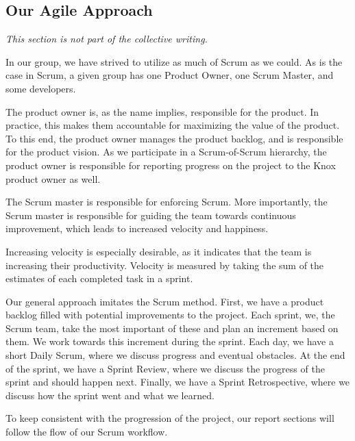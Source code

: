 \subsection{Our Agile Approach}\label{our_agile_approach}
\textit{This section is not part of the collective writing.}

In our group, we have strived to utilize as much of Scrum as we could.
As is the case in Scrum, a given group has one Product Owner, one Scrum Master, and some developers.

The product owner is, as the name implies, responsible for the product. In practice, this makes them accountable for maximizing the value of the product. To this end, the product owner manages the product backlog, and is responsible for the product vision. As we participate in a Scrum-of-Scrum hierarchy, the product owner is responsible for reporting progress on the project to the Knox product owner as well.

The Scrum master is responsible for enforcing Scrum. More importantly, the Scrum master is responsible for guiding the team towards continuous improvement, which leads to increased velocity and happiness.

Increasing velocity is especially desirable, as it indicates that the team is increasing their productivity. Velocity is measured by taking the sum of the estimates of each completed task in a sprint.\cite{sutherlandScrumArtDoing2014} 

Our general approach imitates the Scrum method. First, we have a product backlog filled with potential improvements to the project. Each sprint, we, the Scrum team, take the most important of these and plan an increment based on them. We work towards this increment during the sprint. Each day, we have a short Daily Scrum, where we discuss progress and eventual obstacles. At the end of the sprint, we have a Sprint Review, where we discuss the progress of the sprint and should happen next. Finally, we have a Sprint Retrospective, where we discuss how the sprint went and what we learned.

To keep consistent with the progression of the project, our report sections will follow the flow of our Scrum workflow.